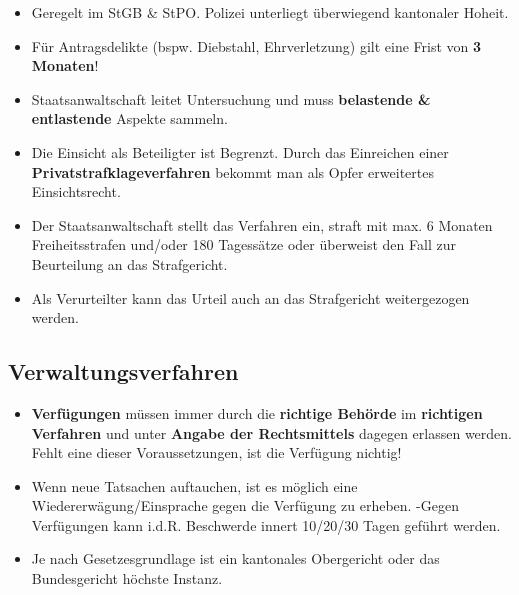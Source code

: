 \begin{itemize}
	\tightlist
	\item Geregelt im StGB \& StPO. Polizei unterliegt überwiegend
	kantonaler Hoheit.
	\item Für Antragsdelikte (bspw. Diebstahl, Ehrverletzung) gilt eine Frist 
	von \textbf{3 Monaten}!
	\item Staatsanwaltschaft leitet Untersuchung und muss \textbf{belastende \&
	entlastende} Aspekte sammeln.
	\item  Die Einsicht als Beteiligter ist Begrenzt. Durch das Einreichen einer
	\textbf{Privatstrafklageverfahren}
	bekommt man als Opfer erweitertes Einsichtsrecht.
	\item Der Staatsanwaltschaft stellt das Verfahren ein, straft mit max.
	6 Monaten Freiheitsstrafen und/oder 180 Tagessätze oder überweist den
	Fall zur Beurteilung an das Strafgericht.
	\item Als Verurteilter kann das Urteil auch an das Strafgericht
	weitergezogen werden.
\end{itemize}


\subsection{Verwaltungsverfahren}

\begin{itemize}
	\tightlist
	\item \textbf{Verfügungen} müssen immer durch die \textbf{richtige Behörde}
	im \textbf{richtigen Verfahren} und unter \textbf{Angabe der
	Rechtsmittels} dagegen erlassen werden. Fehlt eine dieser
	Voraussetzungen, ist die Verfügung nichtig!
	\item Wenn neue Tatsachen auftauchen, ist es möglich eine
	Wiedererwägung/Einsprache gegen die Verfügung zu erheben. -Gegen
	Verfügungen kann i.d.R. Beschwerde innert 10/20/30 Tagen geführt
	werden.
	\item Je nach Gesetzesgrundlage ist ein kantonales Obergericht oder das
	Bundesgericht höchste Instanz.
\end{itemize}

